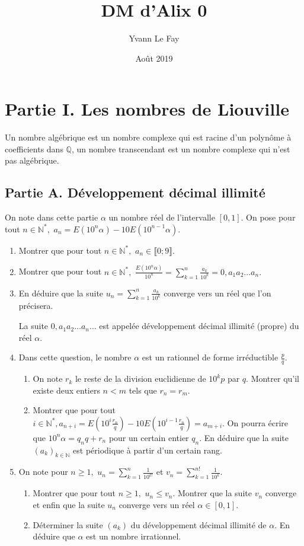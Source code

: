 \documentclass{article}
\begin{document}
\title{DM d'Alix 0 }
\author{Yvann Le Fay}
\date{Août 2019}
\maketitle
\section{Partie I. Les nombres de Liouville}
Un nombre algébrique est un nombre complexe qui est racine d'un polynôme à coefficients dans $\mathbb{Q}$, un nombre transcendant est un nombre complexe qui n'est pas algébrique.

\subsection{Partie A. Développement décimal illimité}
On note dans cette partie $\alpha$ un nombre réel de l'intervalle $[0, 1]$. On pose pour tout $n\in\mathbb{N}^*, \,\, a_n = E(10^n\alpha)-10E(10^{n-1}\alpha)$.
\begin{enumerate}
	\item Montrer que pour tout $n\in\mathbb{N}^*,\,\, a_n\in\llbracket 0;9\rrbracket$.
	\item Montrer que pour tout $n\in\mathbb{N}^*,\,\, \frac{E(10^n \alpha)}{10^n} = \sum_{k=1}^n \frac{a_k}{10^k} = 0,a_1a_2\ldots a_n.$
	\item En déduire que la suite $u_n = \sum_{k=1}^n \frac{a_k}{10^k}$ converge vers un réel que l'on précisera.
	
		La suite $0,a_1a_2\ldots a_n\ldots$ est appelée développement décimal illimité (propre) du réel $\alpha$.
	\item Dans cette question, le nombre $\alpha$ est un rationnel de forme irréductible $\frac{p}{q}$.
		\begin{enumerate}
			\item On note $r_k$ le reste de la division euclidienne de $10^k p$ par $q$. Montrer qu'il existe deux entiers $n<m$ tels que $r_n = r_m$.
			\item Montrer que pour tout $i\in\mathbb{N}^*, a_{n+i}=E(10^i \frac{r_n}{q}) - 10E(10^{i-1}\frac{r_n}{q}) = a_{m+i}$. On pourra écrire que $10^n\alpha = q_nq+r_n$ pour un certain entier $q_n$. En déduire que la suite $(a_k)_{k\in\mathbb{N}}$ est périodique à partir d'un certain rang.
		\end{enumerate}
\item On note pour $n\geq 1, \,\, u_n = \sum_{k=1}^n \frac{1}{10^{k!}} $ et $v_n = \sum_{k=1}^{n!}\frac{1}{10^k}$.
	\begin{enumerate}
		\item Montrer que pour tout $n\geq 1,\,\, u_n\leq v_n$. Montrer que la suite $v_n$ converge et enfin que la suite $u_n$ converge vers un réel $\alpha\in [0,1]$.
		\item Déterminer la suite $(a_k)$ du développement décimal illimité de $\alpha$. En déduire que $\alpha$ est un nombre irrationnel.
	\end{enumerate}
\end{enumerate}
\end{document}
